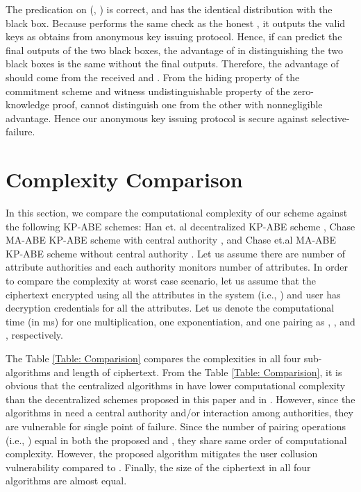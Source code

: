 \documentclass[10pt,journal]{IEEEtran}
\begin{document}
The predication on (, ) is correct, and has the identical distribution with the black box. Because  performs the same check as the honest , it outputs the valid keys as  obtains from anonymous key issuing protocol. Hence, if  can predict the final outputs of
the two black boxes, the advantage of  in distinguishing the two black boxes is the same without the final outputs. Therefore, the advantage
of  should come from the received  and . From the hiding property of the commitment scheme and witness undistinguishable property of the zero-knowledge proof,  cannot distinguish one from the other with nonnegligible advantage. Hence our anonymous key issuing protocol is secure against selective-failure.

\section{Complexity Comparison}
In this section, we compare the computational complexity of our scheme against the following KP-ABE  schemes: Han et. al decentralized KP-ABE scheme \cite{main1}, Chase MA-ABE KP-ABE scheme with central authority \cite{maabe}, and Chase et.al MA-ABE KP-ABE scheme without central authority \cite{imaabe}. Let us assume there are  number of attribute authorities and each authority monitors  number of attributes. In order to compare the complexity at worst case scenario, let us assume that the ciphertext encrypted using all the attributes in the system (i.e., ) and user has decryption credentials for all the attributes.  Let us denote the computational time (in ms) for one multiplication, one exponentiation,  and  one pairing as  , , and , respectively.



 The Table \ref{Table: Comparision} compares the complexities in all four sub-algorithms and length of ciphertext. From the Table \ref{Table: Comparision}, it is obvious that the centralized algorithms in  \cite{maabe,imaabe} have lower computational complexity than the decentralized schemes proposed in this paper and in  \cite{main1}. However, since the algorithms in \cite{maabe,imaabe} need a central authority and/or interaction among authorities, they are vulnerable for single point of failure. Since the number of pairing operations (i.e., ) equal in both the proposed and  \cite{main1}, they share same order of computational complexity. However, the proposed algorithm mitigates the user collusion vulnerability  compared to \cite{main1}. Finally, the size of the ciphertext in all four algorithms are almost equal.
\end{document}
